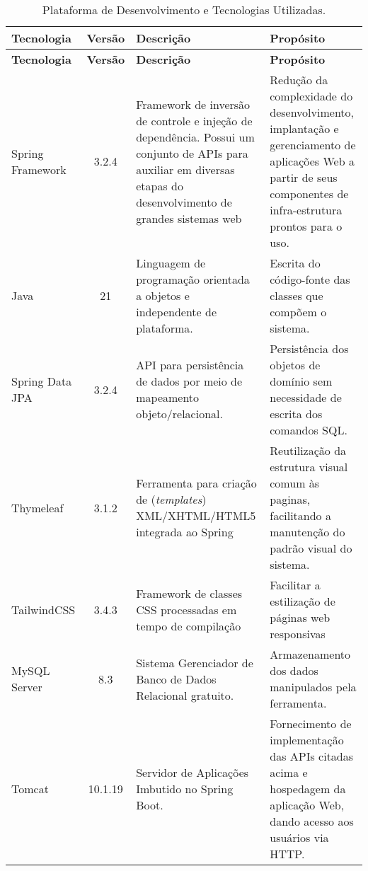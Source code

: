 \begin{footnotesize}
\begin{longtable}{|p{1.8cm}|c|p{5cm}|p{6.3cm}|}
	\caption{Plataforma de Desenvolvimento e Tecnologias Utilizadas.}	
	\label{tabela-plataforma}\\\hline

	\rowcolor{lightgray}
	\textbf{Tecnologia} & \textbf{Versão} & \textbf{Descrição} & \textbf{Propósito} \\\hline 
	\endfirsthead
	\hline
	\rowcolor{lightgray}
	\textbf{Tecnologia} & \textbf{Versão} & \textbf{Descrição} & \textbf{Propósito} \\\hline 
	\endhead
		
	Spring Framework & 3.2.4 & Framework de inversão de controle e injeção de dependência. Possui um conjunto de APIs para auxiliar em diversas etapas do desenvolvimento de grandes sistemas web & Redução da complexidade do desenvolvimento, implantação e gerenciamento de aplicações Web a partir de seus componentes de infra-estrutura prontos para o uso. \\ \hline

	Java & 21 & Linguagem de programação orientada a objetos e independente de plataforma. & Escrita do código-fonte das classes que compõem o sistema. \\\hline
	
	Spring Data JPA & 3.2.4 & API para persistência de dados por meio de mapeamento objeto/relacional. & Persistência dos objetos de domínio sem necessidade de escrita dos comandos SQL. \\\hline
  
	Thymeleaf & 3.1.2 &  Ferramenta para criação de (\textit{templates}) XML/XHTML/HTML5 integrada ao Spring & Reutilização da estrutura visual comum às paginas, facilitando a manutenção do padrão visual do sistema. \\\hline

    TailwindCSS & 3.4.3 & Framework de classes CSS processadas em tempo de compilação & Facilitar a estilização de páginas web responsivas \\\hline
		
	MySQL Server & 8.3 & Sistema Gerenciador de Banco de Dados Relacional gratuito. & Armazenamento dos dados manipulados pela ferramenta. \\\hline
	
	Tomcat & 10.1.19 & Servidor de Aplicações Imbutido no Spring Boot. & Fornecimento de implementação das APIs citadas acima e hospedagem da aplicação Web, dando acesso aos usuários via HTTP. \\\hline
\end{longtable}
\end{footnotesize}






